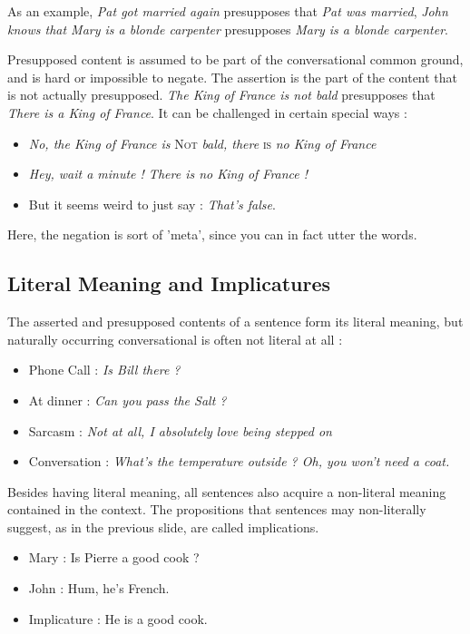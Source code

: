 \documentclass{cours}
\begin{document}
As an example, \textsl{Pat got married again} presupposes that \textsl{Pat was married}, \textsl{John knows that Mary is a blonde carpenter} presupposes \textsl{Mary is a blonde carpenter}.

Presupposed content is assumed to be part of the conversational common ground, and is hard or impossible to negate. The assertion is the part of the content that is not actually presupposed. \textsl{The King of France is not bald} presupposes that \textsl{There is a King of France}. It can be challenged in certain special ways :
\begin{itemize}
    \item \textsl{No, the King of France is} \textsc{Not} \textsl{bald, there} \textsc{is} \textsl{no King of France}
    \item \textsl{Hey, wait a minute ! There is no King of France !}
    \item But it seems weird to just say : \textsl{That's false}.
\end{itemize}
Here, the negation is sort of 'meta', since you can in fact utter the words.

\subsection{Literal Meaning and Implicatures}
The asserted and presupposed contents of a sentence form its literal meaning, but naturally occurring conversational is often not literal at all :
\begin{itemize}
    \item Phone Call : \textsl{Is Bill there ? }
    \item At dinner : \textsl{Can you pass the Salt ?}
    \item Sarcasm : \textsl{Not at all, I absolutely} \emph{love} \textsl{being stepped on}
    \item Conversation : \textsl{What's the temperature outside ? Oh, you won't need a coat.}
\end{itemize}
Besides having literal meaning, all sentences also acquire a non-literal meaning contained in the context. The propositions that sentences may non-literally suggest, as in the previous slide, are called implications. 

\begin{itemize}
    \item Mary : Is Pierre a good cook ? 
    \item John : Hum, he's French.
    \item Implicature : He is a good cook.
\end{itemize}
\end{document}
